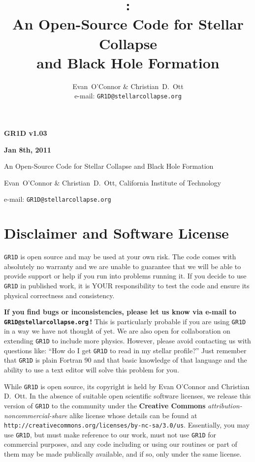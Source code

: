\documentclass[10pt,nofootinbib]{article}
\title{\code{GR1D}:\\ An Open-Source Code for Stellar Collapse\\
 and Black Hole Formation}
\author{Evan\ O'Connor \& Christian\ D.\ Ott\\e-mail: {\tt GR1D@stellarcollapse.org}}
\newcommand{\code}[1]{\texttt{#1}}
\begin{document}
\begin{center}
\Large \bf GR1D v1.03 \rm \normalsize

 \bf Jan 8th, 2011 \rm

\large An Open-Source Code for Stellar Collapse and Black Hole Formation
\normalsize

Evan\ O'Connor \& Christian\ D.\ Ott, California Institute of Technology

e-mail: {\tt GR1D@stellarcollapse.org}

\end{center}


\section{Disclaimer and Software License}
\code{GR1D} is open source and may be used at your own risk.  The code
comes with absolutely no warranty and we are unable to guarantee that
we will be able to provide support or help if you run into problems
running it. If you decide to use \code{GR1D} in published work, it is
YOUR responsibility to test the code and ensure its physical
correctness and consistency. 

{\bf If you find bugs or inconsistencies, please let us know via
  e-mail to \\ {\tt GR1D@stellarcollapse.org}\,!} This is particularly
probable if you are using \code{GR1D} in a way we have not thought of
yet.  We are also open for collaboration on extending \code{GR1D} to
include more physics. However, please avoid contacting us with
questions like: ``How do I get \code{GR1D} to read in my stellar
profile?'' Just remember that \code{GR1D} is plain Fortran 90 and that
basic knowledge of that language and the ability to use a text editor
will solve this problem for you.

While \code{GR1D} is open source, its copyright is held by Evan
O'Connor and Christian D.\ Ott. In the absence of suitable open
scientific software licenses, we release this version of \code{GR1D}
to the community under the {\bf Creative Commons}
\emph{attribution-noncommercial-share} alike license whose details can
be found at {\tt
  http://creativecommons.org/licenses/by-nc-sa/3.0/us}. Essentially,
you may use \code{GR1D}, but must make reference to our work, must not
use \code{GR1D} for commercial purposes, and any code including or
using our routines or part of them may be made publically available,
and if so, only under the same license.
\end{document}
